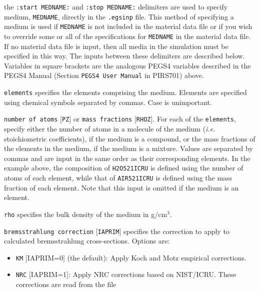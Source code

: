 \documentclass[12pt,twoside]{article}
\begin{document}
\begin{description}
\item the {\tt :start MEDNAME:} and {\tt :stop MEDNAME:} delimiters are used to specify medium, {\tt MEDNAME}, directly in the
{\tt .egsinp} file.  This method of specifying a medium is used if {\tt MEDNAME} is not included in the material data file or
if you wish to override some or all of the specifications for {\tt MEDNAME} in the material data file.
If no material data file is input, then all media in the simulation
must be specified in this way.  The inputs between these delimiters are described below.  Variables
in square brackets are the analogous PEGS4 variables described in the PEGS4 Manual (Section {\tt PEGS4 User Manual} in PIRS701) above.
\begin{description}
\item {\tt elements} specifies the elements comprising the medium.  Elements are specified using chemical symbols separated by
commas.  Case is unimportant.
\item {\tt number of atoms} $[${\tt PZ}$]$ or {\tt mass fractions} $[${\tt RHOZ}$]$.  For each of the {\tt elements}, specify either the number of atoms in a molecule of the medium ({\it i.e.} stoichiometric coefficients), if the
medium is a compound, or the mass fractions of the elements in the medium,
if the medium is a mixture.
Values are separated by commas and are input in the same order as their corresponding elements.  In the example above,
the composition of {\tt H2O521ICRU} is
defined using the number of atoms of each element, while that of {\tt AIR521ICRU} is defined using the mass fraction of each element.  Note that this input
is omitted if the medium is an element.
\item {\tt rho} specifies the bulk density of the medium in g/cm$^3$.
\item {\tt bremsstrahlung correction} $[${\tt IAPRIM}$]$ specifies the
correction to apply to calculated bremsstrahlung cross-sections.
Options are:
\begin{itemize}
\item {\tt KM} $[$IAPRIM=0$]$ (the default): Apply Koch and Motz\cite{KM59} empirical corrections.
\item {\tt NRC} $[$IAPRIM=1$]$: Apply NRC corrections based on NIST/ICRU\cite{Ro89a}.  These corrections are read from the file

\end{itemize}
\end{description}
\end{description}
\end{document}
